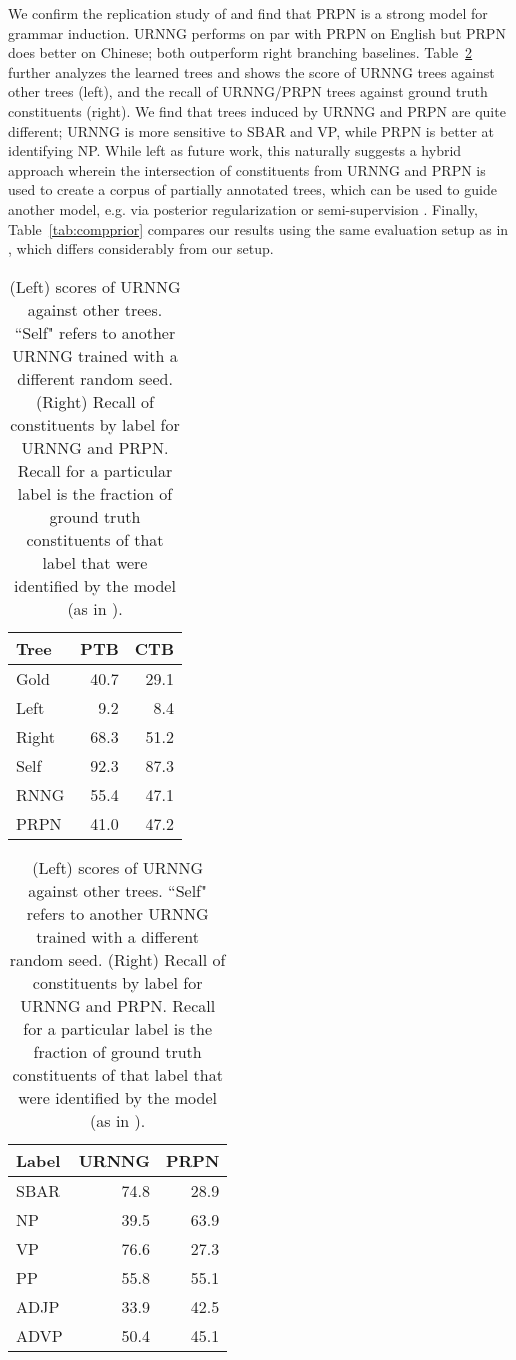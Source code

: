\documentclass[11pt,a4paper]{article}
\begin{document}
 We confirm the replication study of \citet{htut2018grammar} and find that PRPN is a strong model for grammar induction. URNNG performs on par with PRPN on English but PRPN does better on Chinese; both outperform right branching baselines.
Table~\ref{tab:trees} further analyzes the learned trees and shows the  score of URNNG trees against other trees (left), and the recall of URNNG/PRPN trees against ground truth constituents (right). We find that trees induced by URNNG and PRPN are quite different; URNNG is more sensitive to SBAR and VP, while PRPN is better at
identifying NP. While left as future work, this naturally suggests a hybrid approach wherein the intersection of constituents from URNNG and PRPN is used to create a corpus of partially annotated trees, which can be used to guide another model, e.g. via posterior regularization \cite{ganchev2010post} or semi-supervision \cite{hwa1999sup}. 
Finally, Table~\ref{tab:compprior} compares our results using the same evaluation setup as in \citet{drozdov2018latent}, which differs considerably from our setup.
\begin{table}[t]
    \small
    \centering
    \begin{tabular}{l r r}
    \toprule
     Tree & PTB &  CTB \\
    \midrule
Gold & 40.7 & 29.1 \\
Left & 9.2 & 8.4 \\
Right & 68.3 & 51.2 \\
Self & 92.3 & 87.3 \\
RNNG &55.4 & 47.1\\
PRPN & 41.0 & 47.2 \\
         \bottomrule
    \end{tabular}
    \hspace{1mm}
        \begin{tabular}{l r r}
    \toprule
     Label & URNNG &  PRPN \\
    \midrule
SBAR &  74.8 &  28.9\\
NP &   39.5 &63.9  \\
VP & 76.6 &  27.3 \\
PP & 55.8 & 55.1\\
ADJP & 33.9& 42.5\\
ADVP & 50.4 & 45.1 \\
         \bottomrule
    \end{tabular}
        \vspace{-2mm}
    \caption{(Left)  scores of URNNG against other trees. ``Self" refers to another URNNG trained with a different random seed. (Right) Recall of constituents
    by label for URNNG and PRPN.  Recall for a particular label is the fraction of ground truth constituents of that label that were identified by the model (as in \citet{htut2018grammar}).}
    \label{tab:trees}
\end{table}
\vspace{-1mm}
\end{document}
